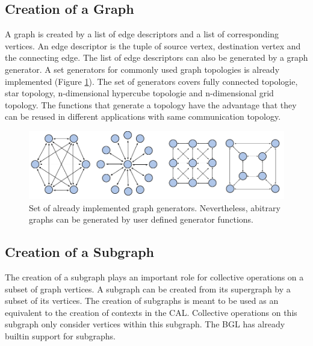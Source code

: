 \subsection{Creation of a Graph}
A graph is created by a list of edge descriptors and a list of
corresponding vertices. An edge descriptor is the tuple of source vertex, destination
vertex and the connecting edge. The list of edge descriptors can
also be generated by a graph generator. A set generators for commonly used
graph topologies is already implemented (Figure \ref{fig:topologies}).
The set of generators covers fully connected topologie, star topology,
n-dimensional hypercube topologie and n-dimensional grid topology.
The functions that generate a topology have the advantage that
they can be reused in different applications with same communication
topology.

\begin{figure}[H]
  \centering
  \includegraphics[width=\textwidth]{graphics/40_topologies}
  \caption{Set of already implemented graph generators. Nevertheless,
  abitrary graphs can be generated by user defined generator functions.}
  \label{fig:topologies}
\end{figure}

\subsection{Creation of a Subgraph}
The creation of a subgraph plays an important role for collective
operations on a subset of graph vertices. A subgraph can be created
from its supergraph by a subset of its vertices.  The creation of
subgraphs is meant to be used as an equivalent to the creation of
contexts in the CAL. Collective operations on this subgraph only
consider vertices within this subgraph. The BGL has already builtin
support for subgraphs.

